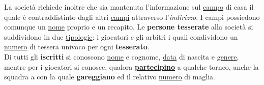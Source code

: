 \documentclass[11pt, openany]{article}
\theoremstyle{definition}
\theoremstyle{plain}
\theoremstyle{remark}
\begin{document}
\begin{tcolorbox}[width=\textwidth,colback={Cornsilk2}]
				La società richiede inoltre che sia mantenuta l’informazione sul \underline{campo} di casa il quale è contraddistinto dagli altri \underline{campi} attraverso l’\textit{indirizzo}. I campi possiedono comunque un \underline{nome} proprio e un recapito.
				Le \textbf{persone tesserate} alla società si suddividono in due \underline{tipologie}: i giocatori e gli arbitri i quali condividono un \underline{numero} di tessera univoco per ogni \textbf{tesserato}.\\
				Di tutti gli \textbf{iscritti} si conoscono \underline{nome} e cognome, \underline{data} di nascita e \underline{genere}, mentre per i giocatori si conosce, qualora \textbf{\underline{partecipino}} a qualche torneo, anche la squadra a con la quale \textbf{gareggiano} ed il relativo \underline{numero} di maglia.
			\end{tcolorbox}
			
\end{document}
